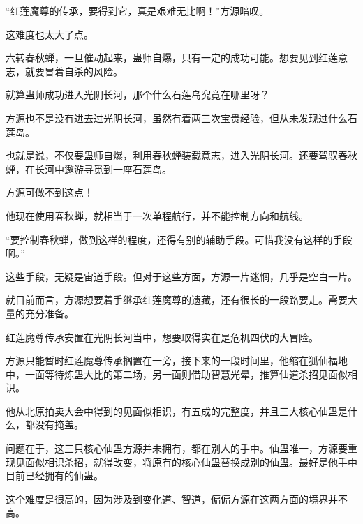\begin{this_body}
“红莲魔尊的传承，要得到它，真是艰难无比啊！”方源暗叹。

这难度也太大了点。

六转春秋蝉，一旦催动起来，蛊师自爆，只有一定的成功可能。想要见到红莲意志，就要冒着自杀的风险。

就算蛊师成功进入光阴长河，那个什么石莲岛究竟在哪里呀？

方源也不是没有进去过光阴长河，虽然有着两三次宝贵经验，但从未发现过什么石莲岛。

也就是说，不仅要蛊师自爆，利用春秋蝉装载意志，进入光阴长河。还要驾驭春秋蝉，在长河中遨游寻觅到一座石莲岛。

方源可做不到这点！

他现在使用春秋蝉，就相当于一次单程航行，并不能控制方向和航线。

“要控制春秋蝉，做到这样的程度，还得有别的辅助手段。可惜我没有这样的手段啊。”

这些手段，无疑是宙道手段。但对于这些方面，方源一片迷惘，几乎是空白一片。

就目前而言，方源想要着手继承红莲魔尊的遗藏，还有很长的一段路要走。需要大量的充分准备。

红莲魔尊传承安置在光阴长河当中，想要取得实在是危机四伏的大冒险。

方源只能暂时红莲魔尊传承搁置在一旁，接下来的一段时间里，他缩在狐仙福地中，一面等待炼蛊大比的第二场，另一面则借助智慧光晕，推算仙道杀招见面似相识。

他从北原拍卖大会中得到的见面似相识，有五成的完整度，并且三大核心仙蛊是什么，都没有掩盖。

问题在于，这三只核心仙蛊方源并未拥有，都在别人的手中。仙蛊唯一，方源要重现见面似相识杀招，就得改变，将原有的核心仙蛊替换成别的仙蛊。最好是他手中目前已经拥有的仙蛊。

这个难度是很高的，因为涉及到变化道、智道，偏偏方源在这两方面的境界并不高。

\end{this_body}

